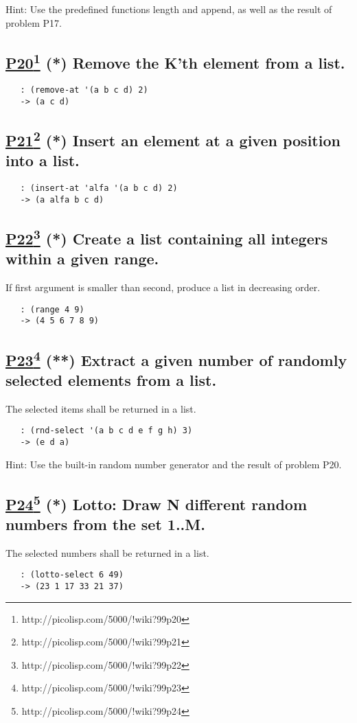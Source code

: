 \documentclass[10pt,a4paper]{article}
\begin{document}
Hint: Use the predefined functions length and append,
as well as the result of problem P17.

\subsection*{\underline{P20}\footnote{http://picolisp.com/5000/!wiki?99p20} (*) Remove the K'th element from a list.}
\begin{verbatim}
   : (remove-at '(a b c d) 2)
   -> (a c d)
\end{verbatim}


\subsection*{\underline{P21}\footnote{http://picolisp.com/5000/!wiki?99p21} (*) Insert an element at a given position into a list.}
\begin{verbatim}
   : (insert-at 'alfa '(a b c d) 2)
   -> (a alfa b c d)
\end{verbatim}


\subsection*{\underline{P22}\footnote{http://picolisp.com/5000/!wiki?99p22} (*) Create a list containing all integers within a given range.}
If first argument is smaller than second, produce a list in
decreasing order.
\begin{verbatim}
   : (range 4 9)
   -> (4 5 6 7 8 9)
\end{verbatim}


\subsection*{\underline{P23}\footnote{http://picolisp.com/5000/!wiki?99p23} (**) Extract a given number of randomly selected elements from a
list.}
The selected items shall be returned in a list.
\begin{verbatim}
   : (rnd-select '(a b c d e f g h) 3)
   -> (e d a)
\end{verbatim}

Hint: Use the built-in random number generator and the result of problem P20.

\subsection*{\underline{P24}\footnote{http://picolisp.com/5000/!wiki?99p24} (*) Lotto: Draw N different random numbers from the set 1..M.}
The selected numbers shall be returned in a list.
\begin{verbatim}
   : (lotto-select 6 49)
   -> (23 1 17 33 21 37)
\end{verbatim}
\end{document}
